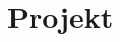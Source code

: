 \documentclass{mwrep}
\begin{document}
\part{Projekt}
\label{PROJEKT}
%
%
%
%
%
%
%

%
%
%

\end{document}
